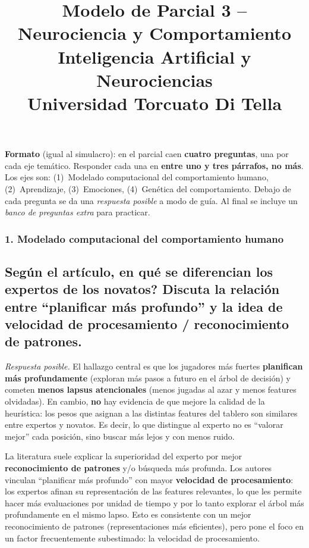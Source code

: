 \documentclass[11pt, a4paper]{article}
\title{\textbf{Modelo de Parcial 3 -- Neurociencia y Comportamiento} \\
\large Inteligencia Artificial y Neurociencias \\ Universidad Torcuato Di Tella}
\author{}
\date{}
\newcommand{\pregunta}[1]{\subsection{#1}}
\newcommand{\eje}[1]{\subsubsection{#1}}
\begin{document}
\maketitle

\begin{mdframed}[linecolor=black, linewidth=0.7pt]
\textbf{Formato} (igual al simulacro): en el parcial caen \textbf{cuatro preguntas}, una por cada eje tem\'atico. Responder cada una en \textbf{entre uno y tres p\'arrafos, no m\'as}. Los ejes son: (1)~Modelado computacional del comportamiento humano, (2)~Aprendizaje, (3)~Emociones, (4)~Gen\'etica del comportamiento. Debajo de cada pregunta se da una \emph{respuesta posible} a modo de gu\'ia. Al final se incluye un \emph{banco de preguntas extra} para practicar.
\end{mdframed}

\eje{1. Modelado computacional del comportamiento humano}
\pregunta{Seg\'un el art\'iculo, \textquestiondown en qu\'e se diferencian los expertos de los novatos? Discuta la relaci\'on entre ``planificar m\'as profundo'' y la idea de velocidad de procesamiento / reconocimiento de patrones.}

\begin{respuesta}
\textit{Respuesta posible.} El hallazgo central es que los jugadores m\'as fuertes \textbf{planifican m\'as profundamente} (exploran m\'as pasos a futuro en el \'arbol de decisi\'on) y cometen \textbf{menos lapsus atencionales} (menos jugadas al azar y menos features olvidadas). En cambio, \textbf{no} hay evidencia de que mejore la calidad de la heur\'istica: los pesos que asignan a las distintas features del tablero son similares entre expertos y novatos. Es decir, lo que distingue al experto no es ``valorar mejor'' cada posici\'on, sino buscar m\'as lejos y con menos ruido.

La literatura suele explicar la superioridad del experto por mejor \textbf{reconocimiento de patrones} y/o b\'usqueda m\'as profunda. Los autores vinculan ``planificar m\'as profundo'' con mayor \textbf{velocidad de procesamiento}: los expertos afinan su representaci\'on de las features relevantes, lo que les permite hacer m\'as evaluaciones por unidad de tiempo y por lo tanto explorar el \'arbol m\'as profundamente en el mismo lapso. Esto es consistente con un mejor reconocimiento de patrones (representaciones m\'as eficientes), pero pone el foco en un factor frecuentemente subestimado: la velocidad de procesamiento.
\end{respuesta}
\end{document}
